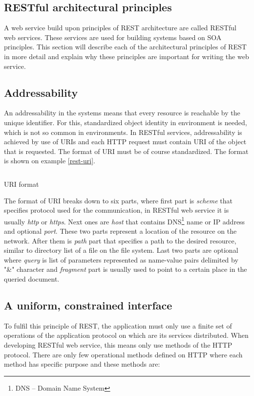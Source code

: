 \documentclass[12pt,final,oneside]{fithesis2}
\begin{document}
\subsection{RESTful architectural principles}
A web service build upon principles of REST architecture are called RESTful web services. These services are used for building systems based on SOA principles. This section will describe each of the architectural principles of REST in more detail and explain why these principles are important for writing the web service.


\subsection*{Addressability}
An addressability in the systems means that every resource is reachable by the unique identifier. For this, standardized object identity in environment is needed, which is not so common in environments. In RESTful services, addressability is achieved by use of URIs and each HTTP request must contain URI of the object that is requested. The format of URI must be of course standardized. The format is shown on example \ref{rest-uri}.

\begin{listing}[ht]
	\inputminted[]{bash}{sources/rest-uri.java}
	\caption{URI format}
	\label{rest-uri}
\end{listing}

The format of URI breaks down to six parts, where first part is \textit{scheme} that specifies protocol used for the communication, in RESTful web service it is usually \textit{http} or \textit{https}. Next ones are \textit{host} that contains DNS\footnote{DNS -- Domain Name System} name or IP address and optional \textit{port}. These two parts represent a location of the resource on the network. After them is \textit{path} part that specifies a path to the desired resource, similar to directory list of a file on the file system. Last two parts are optional where \textit{query} is list of parameters represented as name-value pairs delimited by "\&" character and \textit{fragment} part is usually used to point to a certain place in the queried document.

\subsection*{A uniform, constrained interface}
To fulfil this principle of REST, the application must only use a finite set of operations of the application protocol on which are its services distributed. When developing RESTful web service, this means only use methods of the HTTP protocol. There are only few operational methods defined on HTTP where each method has specific purpose and these methods are:
\end{document}
